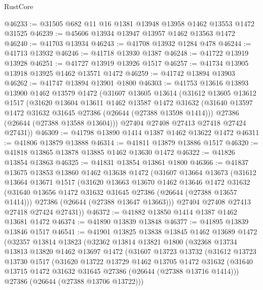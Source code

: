 \begin{lexlean}{RustCore}
\begin{coremodule}
@46233 := @31505 @682 @11 @16 @1381 @13948 @13958 @1462 @13553 @1472 @31525
@46239 := @45606 @13934 @13947 @13957 @1462 @13563 @1472
@46240 := @41703 @13934
@46243 := @41708 @13932 @1284 @478
@46244 := @41713 @13932
@46246 := @41718 @13930 @1387
@46248 := @41722 @13919 @13928
@46251 := @41727 @13919 @13926 @1517
@46257 := @41734 @13905 @13918 @13925 @1462 @13571 @1472
@46259 := @41742 @13894 @13903
@46262 := @41747 @13894 @13901 @1800
@46303 := @41753
    @13616
    @13893
    @13900
    @1462
    @13579
    @1472
    (@31607
      @13605
      @13614
      (@31612
        @13605
        @13612
        @1517
        (@31620
          @13604
          @13611
          @1462
          @13587
          @1472
          @31632
          (@31640 @13597 @1472 @31632 @31645 @27386 (@26644 (@27388 @13598 @1414)))
          @27386
          (@26644 (@27388 @13588 @13604)))
        @27404
        @27408
        @27413
        @27418
        @27424
        @27431))
@46309 := @41798 @13890 @1414 @1387 @1462 @13622 @1472
@46311 := @41806 @13879 @13888
@46314 := @41811 @13879 @13886 @1517
@46320 := @41818 @13865 @13878 @13885 @1462 @13630 @1472
@46322 := @41826 @13854 @13863
@46325 := @41831 @13854 @13861 @1800
@46366 := @41837
    @13675
    @13853
    @13860
    @1462
    @13638
    @1472
    (@31607
      @13664
      @13673
      (@31612
        @13664
        @13671
        @1517
        (@31620
          @13663
          @13670
          @1462
          @13646
          @1472
          @31632
          (@31640 @13656 @1472 @31632 @31645 @27386 (@26644 (@27388 @13657 @1414)))
          @27386
          (@26644 (@27388 @13647 @13663)))
        @27404
        @27408
        @27413
        @27418
        @27424
        @27431))
@46372 := @41882 @13850 @1414 @1387 @1462 @13681 @1472
@46374 := @41890 @13839 @13848
@46377 := @41895 @13839 @13846 @1517
@46541 := @41901
    @13825
    @13838
    @13845
    @1462
    @13689
    @1472
    (@32357
      @13814
      @13823
      (@32362
        @13814
        @13821
        @1800
        (@32368
          @13734
          @13813
          @13820
          @1462
          @13697
          @1472
          (@31607
            @13723
            @13732
            (@31612
              @13723
              @13730
              @1517
              (@31620
                @13722
                @13729
                @1462
                @13705
                @1472
                @31632
                (@31640 @13715 @1472 @31632 @31645 @27386 (@26644 (@27388 @13716 @1414)))
                @27386
                (@26644 (@27388 @13706 @13722)))

\end{coremodule}
\end{lexlean}
